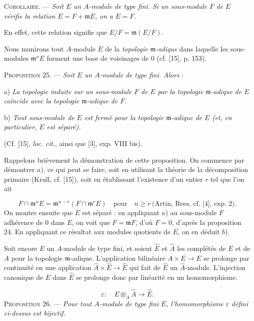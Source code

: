 \textsc{Corollaire}. --- \emph{Soit $E$ un $A$-module de type fini. Si un sous-module $F$ de $E$ vérifie la relation $E = F + \mathfrak{m}E$, on a $E = F$.}

En effet, cette relation signifie que $E/F = \mathfrak{m}(E/F)$.

Nous munirons tout $A$-module $E$ de la \emph{topologie $\mathfrak{m}$-adique} dans laquelle les sous-modules $\mathfrak{m}^n E$ forment une base de voisinages de $0$ (cf. [15], p. 153).

\textsc{Proposition 25}. --- \emph{Soit $E$ un $A$-module de type fini. Alors} :

a) \emph{La topologie induite sur un sous-module $F$ de $E$ par la topologie $\mathfrak{m}$-adique de $E$ coïncide avec la topologie $\mathfrak{m}$-adique de $F$.}

b) \emph{Tout sous-module de $E$ est fermé pour la topologie $\mathfrak{m}$-adique de $E$ (et, en particulier, $E$ est séparé).}

(Cf. [15], \emph{loc. cit.}, ainsi que [3], exp. VIII bis).

Rappelons brièvement la démonstration de cette proposition. On commence par démontrer $a$), ce qui peut se faire, soit en utilisant la théorie de la décomposition primaire (Krull, cf. [15]), soit en établissant l'existence d'un entier $r$ tel que l'on ait

\begin{equation*}
F \cap \mathfrak{m}^n E = \mathfrak{m}^{n-r}(F \cap \mathfrak{m}^r E) \quad \mbox{pour} \quad n \geqslant r \ \mbox{(Artin, Rees, cf. [4], exp. 2).}
\end{equation*}
On montre ensuite que $E$ est séparé : en appliquant $a$) au sous-module $F$ adhérence de $0$ dans $E$, on voit que $F = \mathfrak{m}F$, d'où $F = 0$, d'après la proposition 24. En appliquant ce résultat aux modules quotients de $E$, on en déduit $b$).

Soit encore $E$ un $A$-module de type fini, et soient $\hat{E}$ et $\hat{A}$ les complétés de $E$ et de $A$ pour la topologie $\mathfrak{m}$-adique. L'application bilinéaire $A \times E \to E$ se prolonge par continuité en une application $\hat{A} \times \hat{E} \to \hat{E}$ qui fait de $\hat{E}$ un $\hat{A}$-module. L'injection canonique de $E$ dans $\hat{E}$ se prolonge donc par linéarité en un homomorphisme.

\begin{equation*}
\varepsilon : \quad E \otimes_A \hat{A} \to \hat{E}.
\end{equation*}
\textsc{Proposition 26}. --- \emph{Pour tout $A$-module de type fini $E$, l'homomorphisme $\varepsilon$ défini ci-dessus est bijectif.}


